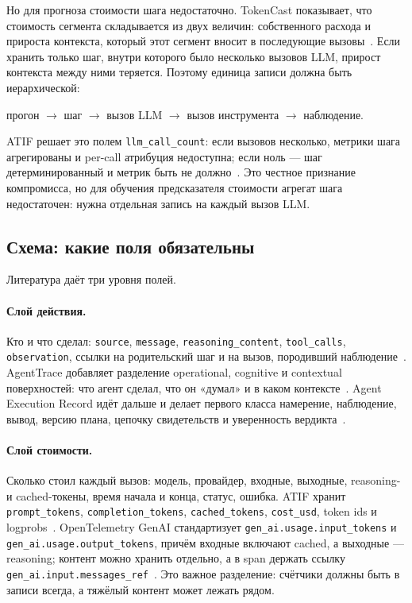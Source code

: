 \documentclass[11pt,a4paper]{article}
\begin{document}
Но для прогноза стоимости шага недостаточно. TokenCast показывает, что
стоимость сегмента складывается из двух величин: собственного расхода и
прироста контекста, который этот сегмент вносит в последующие
вызовы~\cite{ouyang2026tokencast}. Если хранить только шаг, внутри которого
было несколько вызовов LLM, прирост контекста между ними теряется. Поэтому
единица записи должна быть иерархической:

\begin{center}
прогон $\rightarrow$ шаг $\rightarrow$ вызов LLM $\rightarrow$ вызов
инструмента $\rightarrow$ наблюдение.
\end{center}

ATIF решает это полем \texttt{llm\_call\_count}: если вызовов несколько,
метрики шага агрегированы и per-call атрибуция недоступна; если ноль —
шаг детерминированный и метрик быть не должно~\cite{atif2026}. Это честное
признание компромисса, но для обучения предсказателя стоимости агрегат
шага недостаточен: нужна отдельная запись на каждый вызов LLM.

\subsection{Схема: какие поля обязательны}

Литература даёт три уровня полей.

\paragraph{Слой действия.} Кто и что сделал: \texttt{source},
\texttt{message}, \texttt{reasoning\_content}, \texttt{tool\_calls},
\texttt{observation}, ссылки на родительский шаг и на вызов, породивший
наблюдение~\cite{atif2026,bouzenia2025tar}. AgentTrace добавляет
разделение operational, cognitive и contextual поверхностей: что агент
сделал, что он «думал» и в каком контексте~\cite{alsayyad2026agenttrace}.
Agent Execution Record идёт дальше и делает первого класса намерение,
наблюдение, вывод, версию плана, цепочку свидетельств и уверенность
вердикта~\cite{vispute2026aer}.

\paragraph{Слой стоимости.} Сколько стоил каждый вызов: модель, провайдер,
входные, выходные, reasoning- и cached-токены, время начала и конца,
статус, ошибка. ATIF хранит \texttt{prompt\_tokens},
\texttt{completion\_tokens}, \texttt{cached\_tokens}, \texttt{cost\_usd},
token ids и logprobs~\cite{atif2026}. OpenTelemetry GenAI стандартизует
\texttt{gen\_ai.usage.input\_tokens} и
\texttt{gen\_ai.usage.output\_tokens}, причём входные включают cached, а
выходные — reasoning; контент можно хранить отдельно, а в span держать
ссылку \texttt{gen\_ai.input.messages\_ref}~\cite{otel2026genai}. Это
важное разделение: счётчики должны быть в записи всегда, а тяжёлый контент
может лежать рядом.
\end{document}
